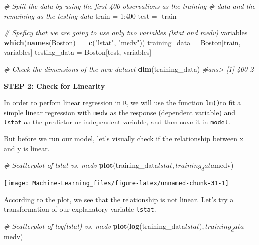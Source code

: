 \documentclass[]{book}
\newenvironment{Shaded}{\begin{snugshade}}{\end{snugshade}}
\newcommand{\KeywordTok}[1]{\textcolor[rgb]{0.13,0.29,0.53}{\textbf{{#1}}}}
\newcommand{\DecValTok}[1]{\textcolor[rgb]{0.00,0.00,0.81}{{#1}}}
\newcommand{\StringTok}[1]{\textcolor[rgb]{0.31,0.60,0.02}{{#1}}}
\newcommand{\CommentTok}[1]{\textcolor[rgb]{0.56,0.35,0.01}{\textit{{#1}}}}
\newcommand{\NormalTok}[1]{{#1}}
\begin{document}
\begin{Shaded}
\begin{Highlighting}[]
\CommentTok{# Split the data by using the first 400 observations as the training}
\CommentTok{# data and the remaining as the testing data}
\NormalTok{train =}\StringTok{ }\DecValTok{1}\NormalTok{:}\DecValTok{400}
\NormalTok{test =}\StringTok{ }\NormalTok{-train}

\CommentTok{# Speficy that we are going to use only two variables (lstat and medv)}
\NormalTok{variables =}\StringTok{ }\KeywordTok{which}\NormalTok{(}\KeywordTok{names}\NormalTok{(Boston) ==}\KeywordTok{c}\NormalTok{(}\StringTok{"lstat"}\NormalTok{, }\StringTok{"medv"}\NormalTok{))}
\NormalTok{training_data =}\StringTok{ }\NormalTok{Boston[train, variables]}
\NormalTok{testing_data =}\StringTok{ }\NormalTok{Boston[test, variables]}

\CommentTok{# Check the dimensions of the new dataset}
\KeywordTok{dim}\NormalTok{(training_data)}
\CommentTok{#ans> [1] 400   2}
\end{Highlighting}
\end{Shaded}

\textbf{STEP 2: Check for Linearity}

In order to perfom linear regression in \texttt{R}, we will use the
function \texttt{lm()}to fit a simple linear regression with
\texttt{medv} as the response (dependent variable) and \texttt{lstat} as
the predictor or independent variable, and then save it in
\texttt{model}.

But before we run our model, let's visually check if the relationship
between x and y is linear.

\begin{Shaded}
\begin{Highlighting}[]
\CommentTok{# Scatterplot of lstat vs. medv}
\KeywordTok{plot}\NormalTok{(training_data$lstat, training_data$medv)}
\end{Highlighting}
\end{Shaded}

\begin{center}\texttt{[image: Machine-Learning\_files/figure-latex/unnamed-chunk-31-1]} \end{center}

According to the plot, we see that the relationship is not linear. Let's
try a transformation of our explanatory variable \texttt{lstat}.

\begin{Shaded}
\begin{Highlighting}[]
\CommentTok{# Scatterplot of log(lstat) vs. medv}
\KeywordTok{plot}\NormalTok{(}\KeywordTok{log}\NormalTok{(training_data$lstat), training_data$medv)}
\end{Highlighting}
\end{Shaded}
\end{document}

